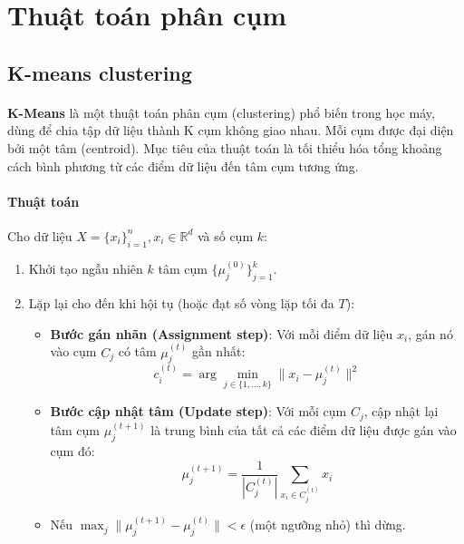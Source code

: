 \section{Thuật toán phân cụm}
\subsection{K-means clustering}

\paragraph{}{\textbf{K-Means} là một thuật toán phân cụm (clustering) phổ biến trong học máy, dùng để chia tập dữ liệu thành K cụm không giao nhau. Mỗi cụm được đại diện bởi một tâm (centroid). Mục tiêu của thuật toán là tối thiểu hóa tổng khoảng cách bình phương từ các điểm dữ liệu đến tâm cụm tương ứng.}

\paragraph{Thuật toán}
Cho dữ liệu $X = \{x_i\}_{i=1}^n, x_i \in \mathbb{R}^d$ và số cụm $k$:
\begin{enumerate}
  \item Khởi tạo ngẫu nhiên $k$ tâm cụm $\{\mu_j^{(0)}\}_{j=1}^k$.
  \item Lặp lại cho đến khi hội tụ (hoặc đạt số vòng lặp tối đa $T$):
    \begin{itemize}
      \item \textbf{Bước gán nhãn (Assignment step)}: Với mỗi điểm dữ liệu $x_i$, gán nó vào cụm $C_j$ có tâm $\mu_j^{(t)}$ gần nhất:
      \[
        c_i^{(t)} = \arg\min_{j \in \{1, \dots, k\}} \| x_i - \mu_j^{(t)} \|^2
      \]
      \item \textbf{Bước cập nhật tâm (Update step)}: Với mỗi cụm $C_j$, cập nhật lại tâm cụm $\mu_j^{(t+1)}$ là trung bình của tất cả các điểm dữ liệu được gán vào cụm đó:
      \[
        \mu_j^{(t+1)} = \frac{1}{|C_j^{(t)}|} \sum_{x_i \in C_j^{(t)}} x_i
      \]
      \item Nếu $\max_j \| \mu_j^{(t+1)} - \mu_j^{(t)} \| < \epsilon$ (một ngưỡng nhỏ) thì dừng.
    \end{itemize}
\end{enumerate}


